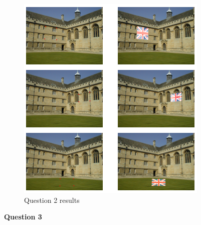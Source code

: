 \documentclass[11pt]{article}
\begin{document}
\begin{figure}[!h]
    \centering
    \includegraphics[width=\textwidth]{Images/2.png}
    \caption{Question 2 results}
    \label{Q2}
\end{figure}

\newpage
\noindent \textbf{Question 3}
\end{document}
